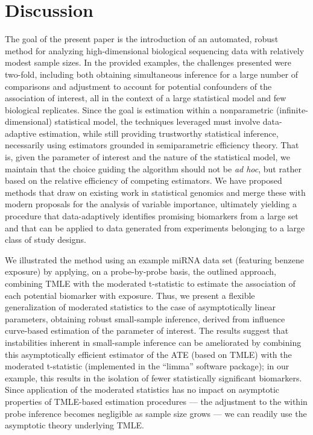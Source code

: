 \chapter{Discussion}

The goal of the present paper is the introduction of an automated, robust
method for analyzing high-dimensional biological sequencing data with relatively
modest sample sizes. In the provided examples, the challenges presented were
two-fold, including both obtaining simultaneous inference for a large number of
comparisons and adjustment to account for potential confounders of the
association of interest, all in the context of a large statistical model and few
biological replicates. Since the goal is estimation within a nonparametric
(infinite-dimensional) statistical model, the techniques leveraged must involve
data-adaptive estimation, while still providing trustworthy statistical
inference, necessarily using estimators grounded in semiparametric efficiency
theory. That is, given the parameter of interest and the nature of the
statistical model, we maintain that the choice guiding the algorithm should not
be \textit{ad hoc}, but rather based on the relative efficiency of competing
estimators. We have proposed methods that draw on existing work in statistical
genomics and merge these with modern proposals for the analysis of variable
importance, ultimately yielding a procedure that data-adaptively identifies
promising biomarkers from a large set and that can be applied to data generated
from experiments belonging to a large class of study designs.

We illustrated the method using an example miRNA data set (featuring benzene
exposure) by applying, on a probe-by-probe basis, the outlined approach,
combining TMLE with the moderated t-statistic to estimate the association of
each potential biomarker with exposure. Thus, we present a flexible
generalization of moderated statistics to the case of asymptotically linear
parameters, obtaining robust small-sample inference, derived from influence
curve-based estimation of the parameter of interest. The results suggest that
instabilities inherent in small-sample inference can be ameliorated by combining
this asymptotically efficient estimator of the ATE (based on TMLE) with the
moderated t-statistic (implemented in the ``limma'' software package); in our
example, this results in the isolation of fewer statistically significant
biomarkers. Since application of the moderated statistics has no impact on
asymptotic properties of TMLE-based estimation procedures --- the adjustment to
the within probe inference becomes negligible as sample size grows --- we can
readily use the asymptotic theory underlying TMLE.

